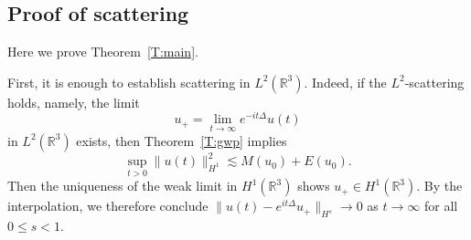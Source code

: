 \documentclass[10pt%
]{amsart}
\numberwithin{equation}{section}
\newcommand{\R}{\mathbb{R}}
\theoremstyle{definition}
\begin{document}
%
%
%
%
\subsection{Proof of scattering}
Here we prove Theorem~\ref{T:main}.

First, it is enough to establish scattering in $L^2(\R^3)$. Indeed, if the $L^2$-scattering holds, namely, the limit
$$
u_+=\lim_{t\to \infty}e^{-it\Delta}u(t)
$$
in $L^2(\R^3)$ exists, then Theorem~\ref{T:gwp} implies
\[
\sup_{t>0}\|u(t)\|_{H^1}^2\lesssim M(u_0)+E(u_0).
\]
Then the uniqueness of the weak limit in $H^1(\R^3)$ shows $u_+\in H^1(\R^3)$. By the interpolation, we therefore conclude $\|u(t)-e^{it\Delta}u_+\|_{H^s}\to 0$ as $t\to \infty$ for all $0\le s<1$. 
\end{document}
